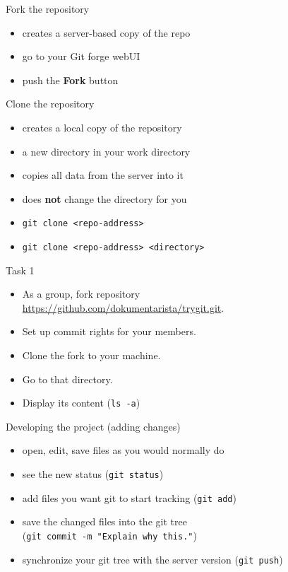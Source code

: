 \documentclass[14pt]{beamer}
\begin{document}
	\begin{frame}{Fork the repository}
	\begin{itemize}
		\item creates a server-based copy of the repo
		\item go to your Git forge webUI
		\item push the \textbf{Fork} button
	\end{itemize}
	\end{frame}


	\begin{frame}{Clone the repository}
	\begin{itemize}
		\item creates a local copy of the repository
		\item a new directory in your work directory
		\item copies all data from the server into it
		\item does \textbf{not} change the directory for you
		\item \texttt{git clone <repo-address>}
		\item \texttt{git clone <repo-address> <directory>}
	\end{itemize}

	\end{frame}

	\begin{frame}{Task 1}
	\begin{itemize}
		\item As a group, fork repository \\ {\small \url{https://github.com/dokumentarista/trygit.git}}.
		\item Set up commit rights for your members.
		\item Clone the fork to your machine.
		\item Go to that directory.
		\item Display its content (\texttt{ls -a})
	\end{itemize}
	
	\end{frame}

	\begin{frame}{Developing the project (adding changes)}
		\begin{itemize}
		\item open, edit, save files as you would normally do
		\item see the new status (\texttt{git status})
		\item add files you want git to start tracking (\texttt{git add})
		\item save the changed files into the git tree \\ (\texttt{git commit -m "Explain why this."})
		\item synchronize your git tree with the server version (\texttt{git push})
		\end{itemize}
	\end{frame}
\end{document}
